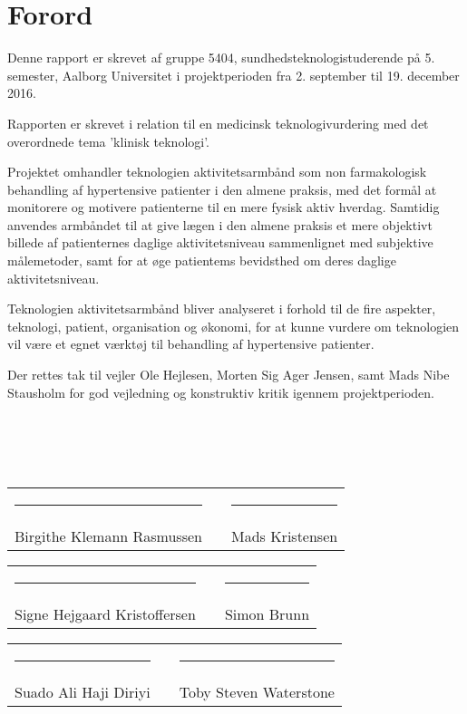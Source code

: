 \chapter*{Forord}

Denne rapport er skrevet af gruppe 5404, sundhedsteknologistuderende på 5. semester, Aalborg Universitet i projektperioden fra 2. september til 19. december 2016.

Rapporten er skrevet i relation til en medicinsk teknologivurdering med det overordnede tema 'klinisk teknologi'. 

Projektet omhandler teknologien aktivitetsarmbånd som non farmakologisk behandling af hypertensive patienter i den almene praksis, med det formål at monitorere og motivere patienterne til en mere fysisk aktiv hverdag. Samtidig anvendes armbåndet til at give lægen i den almene praksis et mere objektivt billede af patienternes daglige aktivitetsniveau sammenlignet med subjektive målemetoder, samt for at øge patientems bevidsthed om deres daglige aktivitetsniveau. 

Teknologien aktivitetsarmbånd bliver analyseret i forhold til de fire aspekter, teknologi, patient, organisation og økonomi, for at kunne vurdere om teknologien vil være et egnet værktøj til behandling af hypertensive patienter.

Der rettes tak til vejler Ole Hejlesen, Morten Sig Ager Jensen, samt Mads Nibe Stausholm for god vejledning og konstruktiv kritik igennem projektperioden. \\\\\\\\\\


\begin{tabular}{lcl}
   \hspace{-1cm} \rule{7cm}{0.5pt} & \hspace{1cm} & \rule{7cm}{0.5pt} \\
   \hspace{-1cm}  Birgithe Klemann Rasmussen&  & Mads Kristensen
\end{tabular}
\vspace{1.5cm}


\begin{tabular}{lcl}
   \hspace{-1cm} \rule{7cm}{0.5pt} & \hspace{1cm} & \rule{7cm}{0.5pt} \\
    \hspace{-1cm} Signe Hejgaard Kristoffersen & & Simon Brunn
\end{tabular}
\vspace{1.5cm}
      

\begin{tabular}{lcl}
    \hspace{-1cm} \rule{7cm}{0.5pt} & \hspace{1cm} & \rule{7cm}{0.5pt} \\
  \hspace{-1cm} Suado Ali Haji Diriyi & & Toby Steven Waterstone
\end{tabular}
\vspace{1.5cm}
    
\newpage